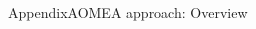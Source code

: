 \begin{frame}{Appendix}{AOMEA approach: Overview}
\begin{columns}
        \begin{column}{0.4\textwidth}
            \centering
        \end{column}

    \end{columns}


\end{frame}

